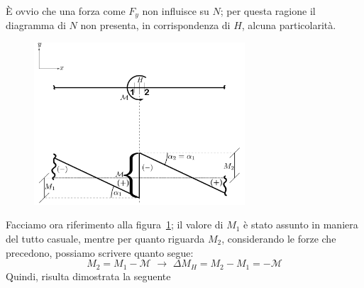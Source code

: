\noindent È ovvio che una forza come $F_{y}$ non influisce su $N$; per questa ragione il diagramma di $N$ non presenta, in corrispondenza di $H$, alcuna particolarità. 
\renewcommand{\thefigure}{13~-~3}
\begin{figure}[ht]
\centering
\includegraphics[width=0.7\textwidth]{Immagini/Parte_13/Figura13_3/figura13_3.pdf}
\caption{}
\label{figura13-3}
\end{figure}
Facciamo ora riferimento alla figura~\ref{figura13-3}; il valore di $M_1$ è stato assunto in maniera del tutto casuale, mentre per quanto riguarda $M_2$, considerando le forze che precedono, possiamo scrivere quanto segue: 
\begin{equation*}
M_2 = M_1 - \mathcal{M} \,\, \longrightarrow \,\, \Delta M_H = M_2 - M_1 = - \mathcal{M}
\end{equation*}
Quindi, risulta dimostrata la seguente
\\

\\


